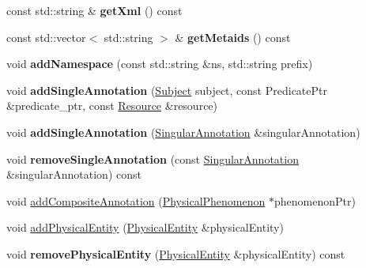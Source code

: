 \begin{DoxyCompactItemize}
\item 
\mbox{\label{classomexmeta_1_1Editor_ad931e829fc9f78717e0c1443c619b7d3}} 
const std\+::string \& {\bfseries get\+Xml} () const
\item 
\mbox{\label{classomexmeta_1_1Editor_a242c86222e1aeff337d3af22641db1de}} 
const std\+::vector$<$ std\+::string $>$ \& {\bfseries get\+Metaids} () const
\item 
\mbox{\label{classomexmeta_1_1Editor_a052a725cee8b8e577c55e977eee81ace}} 
void {\bfseries add\+Namespace} (const std\+::string \&ns, std\+::string prefix)
\item 
\mbox{\label{classomexmeta_1_1Editor_a0417b55575a244817ef981f17c8e1a8f}} 
void {\bfseries add\+Single\+Annotation} (\hyperlink{classomexmeta_1_1Subject}{Subject} subject, const Predicate\+Ptr \&predicate\+\_\+ptr, const \hyperlink{classomexmeta_1_1Resource}{Resource} \&resource)
\item 
\mbox{\label{classomexmeta_1_1Editor_ae46835f3f35425d8087b80d08666aaa4}} 
void {\bfseries add\+Single\+Annotation} (\hyperlink{classomexmeta_1_1Triple}{Singular\+Annotation} \&singular\+Annotation)
\item 
\mbox{\label{classomexmeta_1_1Editor_afcb5ce7397aab23fabd3b4b4b89d3a54}} 
void {\bfseries remove\+Single\+Annotation} (const \hyperlink{classomexmeta_1_1Triple}{Singular\+Annotation} \&singular\+Annotation) const
\item 
void \hyperlink{classomexmeta_1_1Editor_a146ae84fb44991d9c6135e98f03fa972}{add\+Composite\+Annotation} (\hyperlink{classomexmeta_1_1PhysicalPhenomenon}{Physical\+Phenomenon} $\ast$phenomenon\+Ptr)
\item 
void \hyperlink{classomexmeta_1_1Editor_a0740831baafe244374ad7a324d51a87e}{add\+Physical\+Entity} (\hyperlink{classomexmeta_1_1PhysicalEntity}{Physical\+Entity} \&physical\+Entity)
\item 
\mbox{\label{classomexmeta_1_1Editor_a0acf94314252b70a4db89f83e6047e8f}} 
void {\bfseries remove\+Physical\+Entity} (\hyperlink{classomexmeta_1_1PhysicalEntity}{Physical\+Entity} \&physical\+Entity) const

\end{DoxyCompactItemize}
